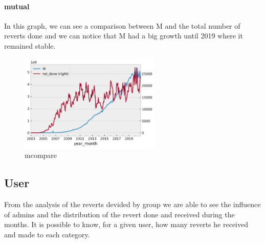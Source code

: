 \paragraph*{mutual}
In this graph, we can see a comparison between M and the total number of reverts done and we can
notice that M had a big growth until 2019 where it remained stable.
\begin{figure}[H]
    \centering
    \includegraphics[width=0.6\textwidth]{./chapters/04/assets/Mcompare.png}
    \caption{mcompare}
    \label{fig:M compared to the number of Reverts}
\end{figure}
\subsection{User}
From the analysis of the reverts devided by group we are able to see the influence of admins and the
distribution of the revert done and received during the months. It is possible to know, for a given
user, how many reverts he received and made to each category.
